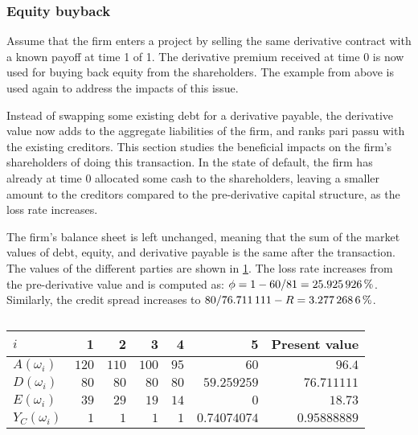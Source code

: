 \documentclass[../main.tex]{subfiles}
\begin{document}
        \subsubsection{Equity buyback}
            Assume that the firm enters a project 
            by selling the same derivative contract with a known payoff at time 1 of 1. 
            The derivative premium received at time 0 is now used for buying back equity from the shareholders. 
            The example from above is used again to address the impacts of this issue.

            Instead of swapping some existing debt for a derivative payable, 
            the derivative value now adds to the aggregate liabilities of the firm, 
            and ranks pari passu with the existing creditors.
            This section studies the beneficial impacts on the firm's shareholders of doing this transaction.
            In the state of default, the firm has already at time 0 allocated some cash to the shareholders, 
            leaving a smaller amount to the creditors compared to the pre-derivative capital structure, 
            as the loss rate increases.

            The firm's balance sheet is left unchanged, meaning that the sum of the market values of debt, equity, 
            and derivative payable is the same after the transaction. 
            The values of the different parties are shown in \cref{tbl:example-equity-buyback}. 
            The loss rate increases from the pre-derivative value and is computed as:
            $\phi = 1 - \num{60}/\num{81} = \pct{0.25925926}$.
            Similarly, the credit spread increases to
            $\num{80}/\num{76.711111} - \grossrfrate = \pct{0.032772686}$.
            \begin{table}[H]
                \centering
                \begin{tabular}{l|rrrrr||r}
                    $i$ & 1 & 2 & 3 & 4 & 5 & Present value \\
                    \hline
                    $A(\omega_{i})$ & $\num{120}$ & $\num{110}$ & $\num{100}$ & $\num{95}$ & $\num{60}$ & $\num{96.4}$ \\
                    $D(\omega_{i})$ & $\num{80}$ & $\num{80}$ & $\num{80}$ & $\num{80}$ & $\num{59.259259}$ & $\num{76.711111}$ \\
                    $E(\omega_{i})$ & $\num{39}$ & $\num{29}$ & $\num{19}$ & $\num{14}$ & $\num{0}$ & $\num{18.73}$ \\
                    $Y_C(\omega_{i})$ & $\num{1}$ & $\num{1}$ & $\num{1}$ & $\num{1}$ & $\num{0.74074074}$ & $\num{0.95888889}$ \\
                \end{tabular}
                \caption{}
                \label{tbl:example-equity-buyback}
            \end{table}
\end{document}
